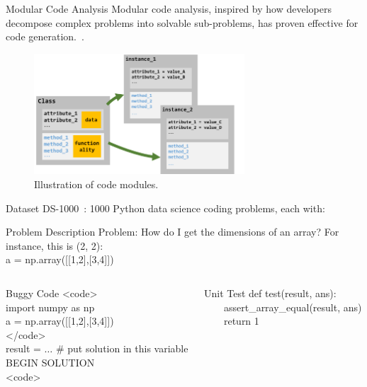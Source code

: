 \begin{frame}{Modular Code Analysis}
    Modular code analysis, inspired by how developers decompose complex problems into solvable sub-problems, has proven effective for code generation.~\cite{le2023codechain}.
    \begin{figure}[!htb]
        \centering
        \includegraphics[width=0.7\textwidth]{img/class_diagram}
        \captionsetup{font=small,labelformat=empty}
        \caption{Illustration of code modules.}
    \end{figure}
\end{frame}

\begin{frame}{Dataset}
    DS-1000~\cite{pmlr-v202-lai23b}: 1000 Python data science coding problems, each with:
    \begin{block}{Problem Description}
        \small
        Problem:
        How do I get the dimensions of an array? For instance, this is (2, 2):\\
        a = np.array([[1,2],[3,4]])
    \end{block}

    \begin{columns}[T]
        \begin{column}{0.50\textwidth}
            \begin{block}{Buggy Code}
                \small
                <code>\\
                import numpy as np\\
                a = np.array([[1,2],[3,4]])\\
                </code>\\
                result = $\ldots$ \# put solution in this variable\\
                BEGIN SOLUTION\\
                <code>
            \end{block}
        \end{column}
        \begin{column}{0.45\textwidth}
            \begin{block}{Unit Test}
                \small
                def test(result, ans):\\
                \ \ \ \ assert\_array\_equal(result, ans)\\
                \ \ \ \ return 1
            \end{block}
        \end{column}
    \end{columns}
\end{frame}
